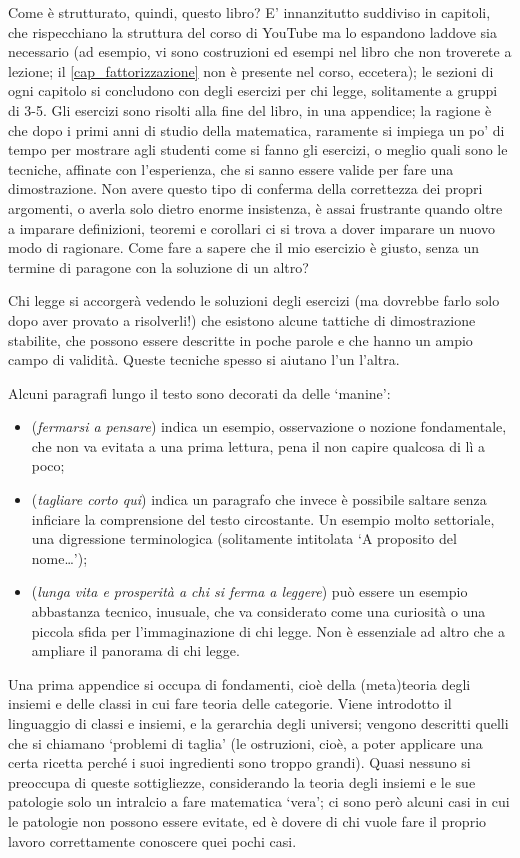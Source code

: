 \medskip
Come è strutturato, quindi, questo libro? E' innanzitutto suddiviso in capitoli, che rispecchiano la struttura del corso di YouTube ma lo espandono laddove sia necessario (ad esempio, vi sono costruzioni ed esempi nel libro che non troverete a lezione; il \autoref{cap_fattorizzazione} non è presente nel corso, eccetera); le sezioni di ogni capitolo si concludono con degli esercizi per chi legge, solitamente a gruppi di 3-5. Gli esercizi sono risolti alla fine del libro, in una appendice; la ragione è che dopo i primi anni di studio della matematica, raramente si impiega un po' di tempo per mostrare agli studenti come si fanno gli esercizi, o meglio quali sono le tecniche, affinate con l'esperienza, che si sanno essere valide per fare una dimostrazione. Non avere questo tipo di conferma della correttezza dei propri argomenti, o averla solo dietro enorme insistenza, è assai frustrante quando oltre a imparare definizioni, teoremi e corollari ci si trova a dover imparare un nuovo modo di ragionare. Come fare a sapere che il mio esercizio è giusto, senza un termine di paragone con la soluzione di un altro?

Chi legge si accorgerà vedendo le soluzioni degli esercizi (ma dovrebbe farlo solo dopo aver provato a risolverli!) che esistono alcune tattiche di dimostrazione stabilite, che possono essere descritte in poche parole e che hanno un ampio campo di validità. Queste tecniche spesso si aiutano l'un l'altra.

Alcuni paragrafi lungo il testo sono decorati da delle `manine':
\begin{itemize}
	\item {} (\emph{fermarsi a pensare}) indica un esempio, osservazione o nozione fondamentale, che non va evitata a una prima lettura, pena il non capire qualcosa di lì a poco;
	\item {} (\emph{tagliare corto qui}) indica un paragrafo che invece è possibile saltare senza inficiare la comprensione del testo circostante. Un esempio molto settoriale, una digressione terminologica (solitamente intitolata `A proposito del nome\dots');
	\item {} (\emph{lunga vita e prosperità a chi si ferma a leggere}) può essere un esempio abbastanza tecnico, inusuale, che va considerato come una curiosità o una piccola sfida per l'immaginazione di chi legge. Non è essenziale ad altro che a ampliare il panorama di chi legge.
\end{itemize}
Una prima appendice si occupa di fondamenti, cioè della (meta)teoria degli insiemi e delle classi in cui fare teoria delle categorie. Viene introdotto il linguaggio di classi e insiemi, e la gerarchia degli universi; vengono descritti quelli che si chiamano `problemi di taglia' (le ostruzioni, cioè, a poter applicare una certa ricetta perché i suoi ingredienti sono troppo grandi). Quasi nessuno si preoccupa di queste sottigliezze, considerando la teoria degli insiemi e le sue patologie solo un intralcio a fare matematica `vera'; ci sono però alcuni casi in cui le patologie non possono essere evitate, ed è dovere di chi vuole fare il proprio lavoro correttamente conoscere quei pochi casi.

